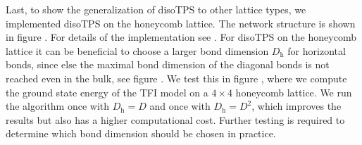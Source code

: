 Last, to show the generalization of disoTPS to other lattice types, we implemented disoTPS on the honeycomb lattice. The network structure is shown in figure \figref{} . For details of the implementation see \cite{}. For disoTPS on the honeycomb lattice it can be beneficial to choose a larger bond dimension $D_\text{h}$ for horizontal bonds, since else the maximal bond dimension of the diagonal bonds is not reached even in the bulk, see figure \figref{}. We test this in figure , where we compute the ground state energy of the TFI model on a $4\times4$ honeycomb lattice. We run the algorithm once with $D_\text{h} = D$ and once with $D_\text{h} = D^2$, which improves the results but also has a higher computational cost. Further testing is required to determine which bond dimension should be chosen in practice.